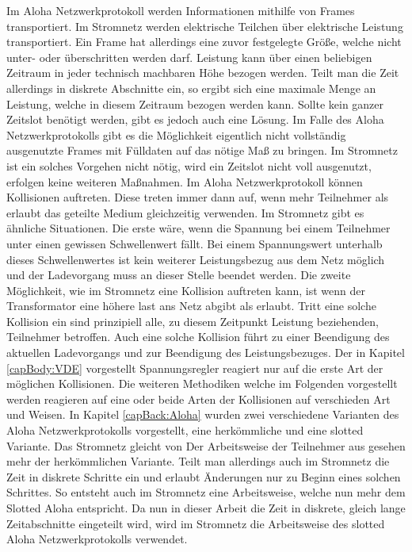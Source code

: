 Im Aloha Netzwerkprotokoll werden Informationen mithilfe von Frames transportiert. Im Stromnetz werden elektrische Teilchen über elektrische Leistung transportiert. Ein Frame hat allerdings eine zuvor festgelegte Größe, welche nicht unter- oder überschritten werden darf. Leistung kann über einen beliebigen Zeitraum in jeder technisch machbaren Höhe bezogen werden. Teilt man die Zeit allerdings in diskrete Abschnitte ein, so ergibt sich eine maximale Menge an Leistung, welche in diesem Zeitraum bezogen werden kann. Sollte kein ganzer Zeitslot benötigt werden, gibt es jedoch auch eine Lösung. Im Falle des Aloha Netzwerkprotokolls gibt es die Möglichkeit eigentlich nicht vollständig ausgenutzte Frames mit Fülldaten auf das nötige Maß zu bringen. Im Stromnetz ist ein solches Vorgehen nicht nötig, wird ein Zeitslot nicht voll ausgenutzt, erfolgen keine weiteren Maßnahmen. Im Aloha Netzwerkprotokoll können Kollisionen auftreten. Diese treten immer dann auf, wenn mehr Teilnehmer als erlaubt das geteilte Medium gleichzeitig verwenden. Im Stromnetz gibt es ähnliche Situationen. Die erste wäre, wenn die Spannung bei einem Teilnehmer unter einen gewissen Schwellenwert fällt. Bei einem Spannungswert unterhalb dieses Schwellenwertes ist kein weiterer Leistungsbezug aus dem Netz möglich und der Ladevorgang muss an dieser Stelle beendet werden. Die zweite Möglichkeit, wie im Stromnetz eine Kollision auftreten kann, ist wenn der Transformator eine höhere last ans Netz abgibt als erlaubt. Tritt eine solche Kollision ein sind prinzipiell alle, zu diesem Zeitpunkt Leistung beziehenden, Teilnehmer betroffen. Auch eine solche Kollision führt zu einer Beendigung des aktuellen Ladevorgangs und zur Beendigung des Leistungsbezuges. Der in Kapitel \ref{capBody:VDE} vorgestellt Spannungsregler reagiert nur auf die erste Art der möglichen Kollisionen. Die weiteren Methodiken welche im Folgenden vorgestellt werden reagieren auf eine oder beide Arten der Kollisionen auf verschieden Art und Weisen.
In Kapitel \ref{capBack:Aloha} wurden zwei verschiedene Varianten des Aloha Netzwerkprotokolls vorgestellt, eine herkömmliche und eine slotted Variante. Das Stromnetz gleicht von Der Arbeitsweise der Teilnehmer aus gesehen mehr der herkömmlichen Variante. Teilt man allerdings auch im Stromnetz die Zeit in diskrete Schritte ein und erlaubt Änderungen nur zu Beginn eines solchen Schrittes. So entsteht auch im Stromnetz eine Arbeitsweise, welche nun mehr dem Slotted Aloha entspricht. Da nun in dieser Arbeit die Zeit in diskrete, gleich lange Zeitabschnitte eingeteilt wird, wird im Stromnetz die Arbeitsweise des slotted Aloha Netzwerkprotokolls verwendet.

